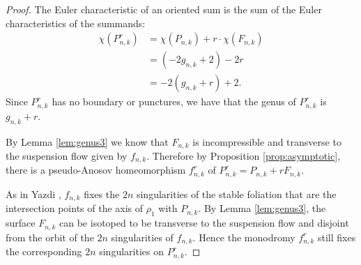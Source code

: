 \begin{proof}
  The Euler characteristic of an oriented sum is the sum of the Euler characteristics of the summands:
  \begin{align*}
    \chi(P^r_{n,k}) &= \chi(P_{n,k}) + r\cdot\chi(F_{n,k}) \\
                    &= (-2g_{n,k} + 2)-2r \\
                    &= -2(g_{n,k} + r) + 2.
  \end{align*}
  Since $P_{n,k}^r$ has no boundary or punctures, we have that the genus of $P_{n,k}^r$ is $g_{n,k}+r$.

  By Lemma \ref{lem:genus3} we know that $F_{n,k}$ is incompressible and transverse to the suspension flow given by $f_{n,k}$.  Therefore by Proposition \ref{prop:asymptotic}, there is a pseudo-Anosov homeomorphism $f_{n,k}^r$ of $P_{n,k}^r=P_{n,k}+rF_{n,k}$.


 As in Yazdi \cite[Lemma 3.5]{yazdibounds}, $f_{n,k}$ fixes the $2n$ singularities of the stable foliation that are the intersection points of the axis of $\rho_1$ with
  $P_{n,k}$. By Lemma \ref{lem:genus3}, the surface $F_{n,k}$ can be isotoped to be transverse to
  the suspension flow and disjoint from the orbit of the $2n$ singularities of $f_{n,k}$.  Hence the monodromy
  $f^r_{n,k}$ still fixes the corresponding $2n$ singularities on $P^r_{n,k}$.
\end{proof}

